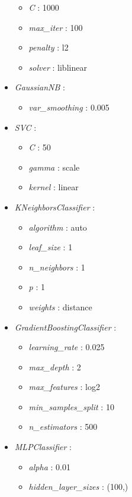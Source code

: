 \documentclass{article}
\begin{document}
\begin{footnotesize}
\begin{multicols}{2}
\begin{itemize}
    \begin{itemize}
        \item \textit{C} : 1000
        \item \textit{max\_iter} : 100
        \item \textit{penalty} : l2
        \item \textit{solver} : liblinear
    \end{itemize}
    \item \textit{GaussianNB} :
    \begin{itemize}
        \item \textit{var\_smoothing} : 0.005
    \end{itemize}
    \item \textit{SVC} :
    \begin{itemize}
        \item \textit{C} : 50
        \item \textit{gamma} : scale
        \item \textit{kernel} : linear
    \end{itemize}
    \item \textit{KNeighborsClassifier} :
    \begin{itemize}
        \item \textit{algorithm} : auto
        \item \textit{leaf\_size} : 1
        \item \textit{n\_neighbors} : 1
        \item \textit{p} : 1
        \item \textit{weights} : distance
    \end{itemize}
    \item \textit{GradientBoostingClassifier} :
    \begin{itemize}
        \item \textit{learning\_rate} : 0.025
        \item \textit{max\_depth} : 2
        \item \textit{max\_features} : log2
        \item \textit{min\_samples\_split} : 10
        \item \textit{n\_estimators} : 500
    \end{itemize}
    \item \textit{MLPClassifier} :
    \begin{itemize}
        \item \textit{alpha} : 0.01
        \item \textit{hidden\_layer\_sizes} : (100,)

\end{itemize}
\end{itemize}
\end{multicols}
\end{footnotesize}
\end{document}
